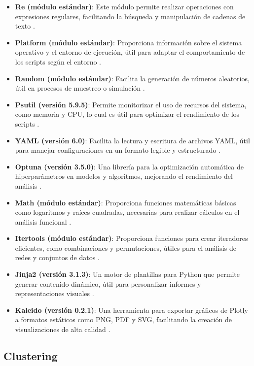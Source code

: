\begin{itemize}
	\item \textbf{Re (módulo estándar)}: Este módulo permite realizar operaciones con expresiones regulares, facilitando la búsqueda y manipulación de cadenas de texto \cite{re}.
	\item \textbf{Platform (módulo estándar)}: Proporciona información sobre el sistema operativo y el entorno de ejecución, útil para adaptar el comportamiento de los scripts según el entorno \cite{platform}.
	\item \textbf{Random (módulo estándar)}: Facilita la generación de números aleatorios, útil en procesos de muestreo o simulación \cite{random}.
	\item \textbf{Psutil (versión 5.9.5)}: Permite monitorizar el uso de recursos del sistema, como memoria y CPU, lo cual es útil para optimizar el rendimiento de los scripts \cite{psutil}.
	\item \textbf{YAML (versión 6.0)}: Facilita la lectura y escritura de archivos YAML, útil para manejar configuraciones en un formato legible y estructurado \cite{pyyaml}.
	\item \textbf{Optuna (versión 3.5.0)}: Una librería para la optimización automática de hiperparámetros en modelos y algoritmos, mejorando el rendimiento del análisis \cite{optuna}.
	\item \textbf{Math (módulo estándar)}: Proporciona funciones matemáticas básicas como logaritmos y raíces cuadradas, necesarias para realizar cálculos en el análisis funcional \cite{math}.
	\item \textbf{Itertools (módulo estándar)}: Proporciona funciones para crear iteradores eficientes, como combinaciones y permutaciones, útiles para el análisis de redes y conjuntos de datos \cite{itertools}.
	\item \textbf{Jinja2 (versión 3.1.3)}: Un motor de plantillas para Python que permite generar contenido dinámico, útil para personalizar informes y representaciones visuales \cite{jinja2}.
	\item \textbf{Kaleido (versión 0.2.1)}: Una herramienta para exportar gráficos de Plotly a formatos estáticos como PNG, PDF y SVG, facilitando la creación de visualizaciones de alta calidad \cite{kaleido}.
	

\end{itemize}



\subsection{Clustering}

